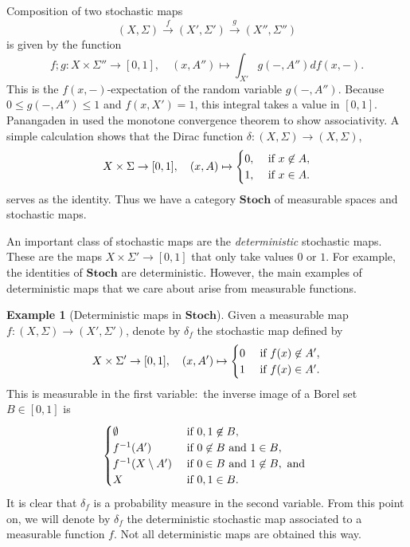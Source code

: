 \documentclass[11pt]{amsart}
\newcommand{\cat}[1]{\mathbf{#1}}
\renewcommand{\t}[1]{\textup{#1}}
\newcommand{\from}{\colon}
\newcommand{\xto}[1]{\xrightarrow{#1}}
\theoremstyle{remark}
\theoremstyle{definition}
\newtheorem{ex}[thm]{Example}
\begin{document}
Composition of two stochastic maps
\[
	(X,\Sigma) \xto{f} (X',\Sigma') \xto{g} (X'',\Sigma'')
\]
is given by the function
\[
	f;g \from X \times \Sigma'' \to [0,1], \quad
	(x,A'') \mapsto \int_{X'} g(-,A'')df(x,-).
\]
This is the $f(x,-)$-expectation of the random variable $g(-,A'')$. Because $0 \leq g(-,A'') \leq 1$ and $f(x,X')=1$, this integral takes a value in $[0,1]$. Panangaden in \cite[Prop. 3.2]{Panangaden_ProbRels} used the monotone convergence theorem to show associativity. A simple calculation shows that the Dirac function $\delta \from (X,\Sigma) \to (X,\Sigma)$,
\[
	X \times \Sigma \to [0,1], \quad 
	(x,A) \mapsto 
	\begin{cases}
		0, & \t{ if } x \not\in A, \\
		1, & \t{ if } x \in A. \\
	\end{cases}
\]
serves as the identity. Thus we have a 
category $\cat{Stoch}$ of measurable 
spaces and stochastic maps.

An important class of stochastic maps are the \emph{deterministic} stochastic 
maps.  These are the maps $X \times \Sigma' \to [0,1]$ that only take values $0$ or $1$. For example, the identities of $\cat{Stoch}$ are deterministic.  However, the main examples of deterministic maps that we care about arise from measurable functions. 

\begin{ex}[Deterministic maps in $\cat{Stoch}$]
	Given a measurable map $f \from (X,\Sigma) \to (X',\Sigma')$, denote by $\delta_f$ the stochastic map defined by 
	\[
	X \times \Sigma' \to [0,1], \quad
	(x,A') \mapsto 
	\begin{cases} 
	0 & \t{ if } f(x) \not\in A', \\ 
	1 & \t{ if } f(x) \in A'. 
	\end{cases}
	\]
	This is measurable in the first variable:\ the inverse image of a Borel set $B 
	\in [0,1]$ is 
	\[\begin{cases}
	\emptyset & \t{ if } 0,1 \not\in B, \\
	f^{-1}(A') & \t{ if } 0 \not\in B \t{ and } 1 \in B, \\
	f^{-1}(X \setminus A') & \t{ if } 0 \in B \t{ and } 1 \not\in B, \t{ and } \\
	X & \t{ if } 0,1 \in B.
	\end{cases}\] 
	It is clear that $\delta_f$ is a probability measure in the second variable. From this point on, we will denote by $\delta_f$ the deterministic stochastic map associated to a measurable function $f$. Not all deterministic maps are obtained this way. 
\end{ex}
\end{document}
